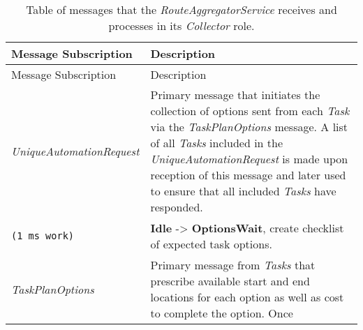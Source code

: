 \begin{longtable}[c]{@{}ll@{}}
\caption{Table of messages that the \emph{RouteAggregatorService}
receives and processes in its \emph{Collector} role.}\tabularnewline
\toprule
\begin{minipage}[b]{0.29\columnwidth}\raggedright\strut
Message Subscription
\strut\end{minipage} &
\begin{minipage}[b]{0.65\columnwidth}\raggedright\strut
Description
\strut\end{minipage}\tabularnewline
\midrule
\endfirsthead
\toprule
\begin{minipage}[b]{0.29\columnwidth}\raggedright\strut
Message Subscription
\strut\end{minipage} &
\begin{minipage}[b]{0.65\columnwidth}\raggedright\strut
Description
\strut\end{minipage}\tabularnewline
\midrule
\endhead
\begin{minipage}[t]{0.29\columnwidth}\raggedright\strut
\emph{UniqueAutomationRequest}
\strut\end{minipage} &
\begin{minipage}[t]{0.65\columnwidth}\raggedright\strut
Primary message that initiates the collection of options sent from each
\emph{Task} via the \emph{TaskPlanOptions} message. A list of all
\emph{Tasks} included in the \emph{UniqueAutomationRequest} is made upon
reception of this message and later used to ensure that all included
\emph{Tasks} have responded.
\strut\end{minipage}\tabularnewline
\begin{minipage}[t]{0.29\columnwidth}\raggedright\strut
\begin{verbatim}
(1 ms work)
\end{verbatim}
\strut\end{minipage} &
\begin{minipage}[t]{0.65\columnwidth}\raggedright\strut
\textbf{Idle} -\textgreater{} \textbf{OptionsWait}, create checklist of
expected task options.
\strut\end{minipage}\tabularnewline
\begin{minipage}[t]{0.29\columnwidth}\raggedright\strut
\emph{TaskPlanOptions}
\strut\end{minipage} &
\begin{minipage}[t]{0.65\columnwidth}\raggedright\strut
Primary message from \emph{Tasks} that prescribe available start and end
locations for each option as well as cost to complete the option. Once

\end{minipage}
\end{longtable}
